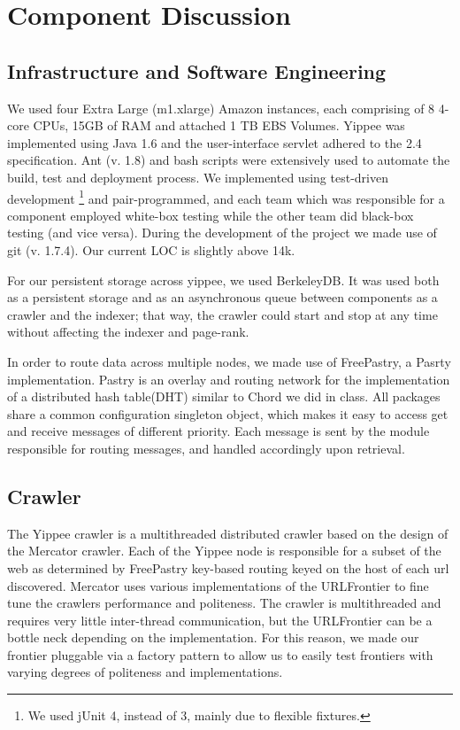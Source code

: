 \documentclass[11pt, letterpaper, oneside, twocolumn]{article}
\begin{document}
\section{Component Discussion}
\label{sec:component}



\subsection{Infrastructure and Software Engineering}

We used four Extra Large (m1.xlarge) Amazon instances, each comprising of 8 4-core CPUs, 15GB of RAM and attached 1 TB EBS Volumes. 
Yippee was implemented using Java 1.6 and the user-interface servlet adhered to the 2.4 specification. 
Ant (v. 1.8) and bash scripts were extensively used to automate the build, test and deployment process. 
We implemented using test-driven development \footnote{We used jUnit 4, instead of 3, mainly due to flexible fixtures.} and pair-programmed, and each team which was responsible for a component employed white-box testing while the other team did black-box testing (and vice versa). 
During the development of the project we made use of git (v. 1.7.4). 
Our current LOC is slightly above 14k.

For our persistent storage across yippee, we used BerkeleyDB. 
It was used both as a persistent storage and as an asynchronous queue between components as a crawler and the indexer; that way, the crawler could start and stop at any time without affecting the indexer and page-rank.  

In order to route data across multiple nodes, we made use of FreePastry, a Pasrty implementation. 
Pastry is an overlay and routing network for the implementation of a distributed hash table(DHT) similar to Chord we did in class. 
All packages share a common configuration singleton object, which makes it easy to access get and receive messages of different priority. 
Each message is sent by the module responsible for routing messages, and handled accordingly upon retrieval.

\subsection{Crawler}

The Yippee crawler is a multithreaded distributed crawler based on the design of the Mercator crawler\cite{mercator}. 
Each of the Yippee node is responsible for a subset of the web as determined by FreePastry key-based routing keyed on the host of each url discovered.
Mercator uses various implementations of the URLFrontier to fine tune the crawlers performance and politeness.
The crawler is multithreaded and requires very little inter-thread communication, but the URLFrontier can be a bottle neck depending on the implementation.
For this reason, we made our frontier pluggable via a factory pattern to allow us to easily test frontiers with varying degrees of politeness and implementations.
\end{document}
